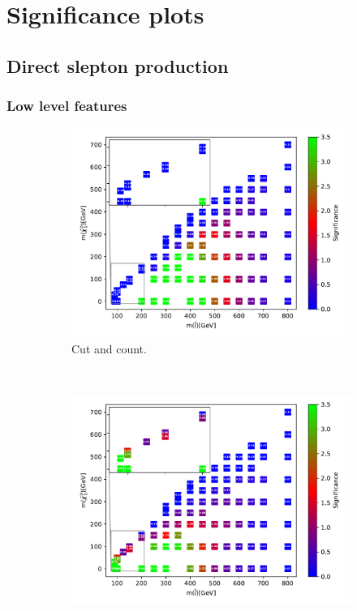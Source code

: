 \chapter{Significance plots}
\label{sec:appsignificance}

\section{Direct slepton production}

\subsection{Low level features}

\newpage

\begin{figure}[H]
    \centering
    \begin{subfigure}[t!]{0.49\textwidth}
    \includegraphics[width = \textwidth]{Figures/Significances/significanceCutandCount_slepslep_all.pdf}
    \caption{Cut and count.}
        \label{fig:signLowSlepSlepcandc}
    \end{subfigure}
    \\
    \begin{subfigure}[t!]{0.49\textwidth}
    \includegraphics[width = \textwidth]{Figures/Significances/significance_BDT_slepslep_Low_level.pdf}

\end{subfigure}
\end{figure}
